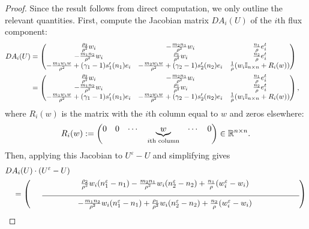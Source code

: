 \documentclass[10pt,reqno]{amsart}
\numberwithin{equation}{section}
\newcommand{\R}{\mathbb R}
\newcommand{\ve}{\varepsilon}
\begin{document}
\begin{proof}
Since the result follows from direct computation, we only outline the relevant quantities. First, compute the Jacobian matrix $DA_i(U)$ of the $i$th flux component:
    \begin{align*}
        DA_i(U)&= \begin{pmatrix}
            \frac{\rho_2}{\rho^2} w_i & - \frac{m_2  n_1}{\rho^2}w_i & \frac{n_1}{\rho} e_i^t \\
            -\frac{m_1   n_2}{\rho^2} w_i & \frac{\rho_1}{\rho^2}w_i & \frac{n_2}{\rho} e_i^t \\
            -\frac{m_1   w_iw}{\rho^2} +  (\gamma_1-1)s_1'(n_1) e_i & -\frac{m_2  w_iw}{\rho^2} +  (\gamma_2-1)s_2'(n_2) e_i  & \frac{1}{\rho} ( w_i \mathbb{I}_{n\times n} + R_i(w))
        \end{pmatrix} \cr
           & = \begin{pmatrix}
            \frac{\rho_2}{\rho^2} w_i & - \frac{m_2  n_1}{\rho^2}w_i & \frac{n_1}{\rho} e_i^t \\
            -\frac{m_1   n_2}{\rho^2} w_i & \frac{\rho_1}{\rho^2}w_i & \frac{n_2}{\rho} e_i^t \\
            -\frac{m_1   w_iw}{\rho^2} +  (\gamma_1-1)s_1'(n_1) e_i & -\frac{m_2  w_iw}{\rho^2} +  (\gamma_2-1)s_2'(n_2) e_i  & \frac{1}{\rho} ( w_i \mathbb{I}_{n\times n} + R_i(w))
        \end{pmatrix},
    \end{align*}
    where $R_i(w)$ is the matrix with the $i$th column equal to $w$ and zeros elsewhere:
    \begin{align*}
        R_i(w) := \begin{pmatrix}
            0 & 0 & \cdots & \underbrace{w}_{\textnormal{$i$th column}} & \cdots & 0 
        \end{pmatrix} \in \R^{n\times n}.
    \end{align*}
    Then, applying this Jacobian to $U^\varepsilon - U$ and simplifying gives  
    \begin{align*}
        &DA_i(U)\cdot (U^\ve - U) \\
        &\quad = \begin{pmatrix}
            \frac{\rho_2}{\rho^2} w_i (n_1^\ve - n_1) - \frac{m_2  n_1}{\rho^2} w_i(n_2^\ve - n_2) + \frac{n_1}{ \rho} (w_i^\ve - w_i) \\
            \vtop{\hsize=12cm \hrulefill}\\
            -\frac{m_1  n_2}{\rho^2} w_i (n_1^\ve-n_1) + \frac{\rho_1}{\rho^2} w_i (n_2^\ve - n_2) + \frac{n_2}{\rho}(w_i^\ve - w_i) \\

\end{pmatrix}
\end{align*}
\end{proof}
\end{document}
